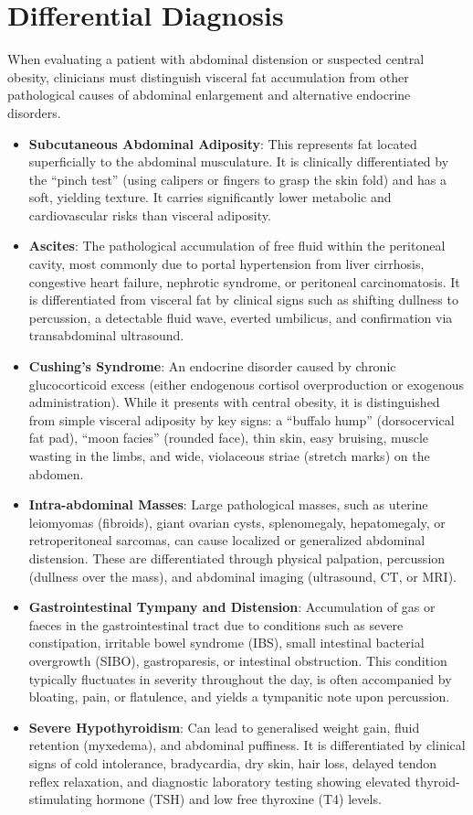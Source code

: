 \section*{Differential Diagnosis}
When evaluating a patient with abdominal distension or suspected central obesity, clinicians must distinguish visceral fat accumulation from other pathological causes of abdominal enlargement and alternative endocrine disorders.

\begin{itemize}
    \item \textbf{Subcutaneous Abdominal Adiposity}: This represents fat located superficially to the abdominal musculature. It is clinically differentiated by the ``pinch test'' (using calipers or fingers to grasp the skin fold) and has a soft, yielding texture. It carries significantly lower metabolic and cardiovascular risks than visceral adiposity.
    \item \textbf{Ascites}: The pathological accumulation of free fluid within the peritoneal cavity, most commonly due to portal hypertension from liver cirrhosis, congestive heart failure, nephrotic syndrome, or peritoneal carcinomatosis. It is differentiated from visceral fat by clinical signs such as shifting dullness to percussion, a detectable fluid wave, everted umbilicus, and confirmation via transabdominal ultrasound.
    \item \textbf{Cushing's Syndrome}: An endocrine disorder caused by chronic glucocorticoid excess (either endogenous cortisol overproduction or exogenous administration). While it presents with central obesity, it is distinguished from simple visceral adiposity by key signs: a ``buffalo hump'' (dorsocervical fat pad), ``moon facies'' (rounded face), thin skin, easy bruising, muscle wasting in the limbs, and wide, violaceous striae (stretch marks) on the abdomen.
    \item \textbf{Intra-abdominal Masses}: Large pathological masses, such as uterine leiomyomas (fibroids), giant ovarian cysts, splenomegaly, hepatomegaly, or retroperitoneal sarcomas, can cause localized or generalized abdominal distension. These are differentiated through physical palpation, percussion (dullness over the mass), and abdominal imaging (ultrasound, CT, or MRI).
    \item \textbf{Gastrointestinal Tympany and Distension}: Accumulation of gas or faeces in the gastrointestinal tract due to conditions such as severe constipation, irritable bowel syndrome (IBS), small intestinal bacterial overgrowth (SIBO), gastroparesis, or intestinal obstruction. This condition typically fluctuates in severity throughout the day, is often accompanied by bloating, pain, or flatulence, and yields a tympanitic note upon percussion.
    \item \textbf{Severe Hypothyroidism}: Can lead to generalised weight gain, fluid retention (myxedema), and abdominal puffiness. It is differentiated by clinical signs of cold intolerance, bradycardia, dry skin, hair loss, delayed tendon reflex relaxation, and diagnostic laboratory testing showing elevated thyroid-stimulating hormone (TSH) and low free thyroxine (T4) levels.
\end{itemize}

